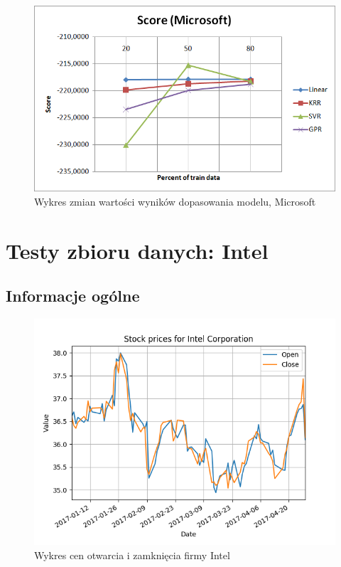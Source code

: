 \begin{figure}[h!]
\centering
\includegraphics[width=150mm]{pictures/plots/microsoft_score.png}
\caption{Wykres zmian wartości wyników dopasowania modelu, Microsoft}
\label{fig:Wykres zmian wartości wyników dopasowania modelu, Microsoft}
\end{figure}



\section{Testy zbioru danych: Intel}

\subsection{Informacje ogólne}

\begin{figure}[h!]
\centering
\includegraphics[width=150mm]{pictures/plots/intel_oc_price.png}
\caption{Wykres cen otwarcia i zamknięcia firmy Intel}
\label{fig:Wykres cen otwarcia i zamknięcia, Intel}
\end{figure}

